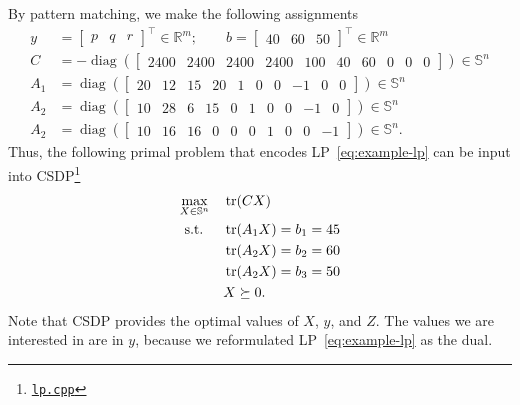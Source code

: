 \documentclass[a4paper]{article}
\DeclareMathOperator{\diag}{diag}
\begin{document}
By pattern matching, we make the following assignments
\begin{align*}
y &= \begin{bmatrix}p & q & r\end{bmatrix}^\top\in\mathbb{R}^m; \qquad b = \begin{bmatrix}40 & 60 & 50\end{bmatrix}^\top\in\mathbb{R}^m \\
C &= -\diag(\begin{bmatrix}2400 & 2400 & 2400 & 2400 & 100 & 40 & 60 & 0 & 0 & 0\end{bmatrix})\in\mathbb{S}^n \\
A_1 &= \diag(\begin{bmatrix}20 & 12 & 15 & 20 & 1 & 0 & 0 & -1 & 0 & 0\end{bmatrix})\in\mathbb{S}^n \\
A_2 &= \diag(\begin{bmatrix}10 & 28 & 6 & 15 & 0 & 1 & 0 & 0 & -1 & 0\end{bmatrix})\in\mathbb{S}^n \\
A_2 &= \diag(\begin{bmatrix}10 & 16 & 16 & 0 & 0 & 0 & 1 & 0 & 0 & -1\end{bmatrix})\in\mathbb{S}^n.
\end{align*}
Thus, the following primal problem that encodes LP~\eqref{eq:example-lp} can be input into CSDP\footnote{\href{https://github.com/plusk01/tests/blob/master/csdp/src/lp.cpp}{\texttt{lp.cpp}}}
\begin{equation}
\begin{aligned}
\max_{X\in\mathbb{S}^n}                 \quad & \tr(CX) \\
\textrm{s.t. } \quad & \tr(A_1X) = b_1 = 45 \\
                     & \tr(A_2X) = b_2 = 60 \\
                     & \tr(A_2X) = b_3 = 50 \\
                     & X \succeq 0.
\end{aligned}
\end{equation}
Note that CSDP provides the optimal values of $X$, $y$, and $Z$.
The values we are interested in are in $y$, because we reformulated LP~\eqref{eq:example-lp} as the dual.
\end{document}
